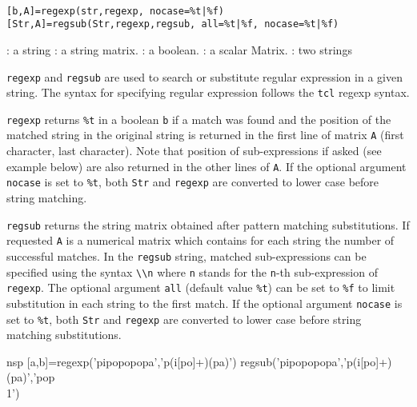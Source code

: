 
\begin{mandesc}
   \\
\end{mandesc}
\begin{calling_sequence}
\begin{verbatim}
[b,A]=regexp(str,regexp, nocase=%t|%f)
[Str,A]=regsub(Str,regexp,regsub, all=%t|%f, nocase=%t|%f)
\end{verbatim}
\end{calling_sequence}

\begin{parameters}
  \begin{varlist}
    : a string
    : a string matrix.
    :  a boolean.
    :  a scalar Matrix.
    : two strings
  \end{varlist}
\end{parameters}

\begin{mandescription}
\noindent \verb+regexp+ and \verb+regsub+ are used to search or substitute regular expression
in a given string. The syntax for specifying regular expression follows the \verb+tcl+ 
regexp syntax.

\verb+regexp+ returns \verb+%t+ in a boolean \verb+b+ if a match was found and the 
position of the matched string in the original string is returned in 
the first line of matrix \verb+A+ (first character, last character). 
Note that position of sub-expressions if asked (see example below) 
are also returned in the other lines of \verb+A+. If the optional argument \verb+nocase+ 
is set to \verb+%t+, both \verb+Str+ and \verb+regexp+ are converted to lower case before string matching.

\verb+regsub+ returns the string matrix obtained after pattern matching substitutions. 
If requested \verb+A+ is a numerical matrix which contains for each string the number of successful matches. 
In the \verb+regsub+ string, matched sub-expressions can be specified using the 
syntax \verb+\\n+ where \verb+n+ stands for the \verb+n+-th sub-expression of 
\verb+regexp+. The optional argument \verb+all+ (default value \verb+%t+) can be set to 
\verb+%f+ to limit substitution in each string to the first match. If the optional argument \verb+nocase+ 
is set to \verb+%t+, both \verb+Str+ and \verb+regexp+ are converted to lower case before string matching 
substitutions. 

\end{mandescription}

\begin{examples}
  \begin{mintednsp}{nsp}
    [a,b]=regexp('pipopopopa','p(i[po]+)(pa)')
    regsub('pipopopopa','p(i[po]+)(pa)','pop\\1')
  \end{mintednsp}
\end{examples}

